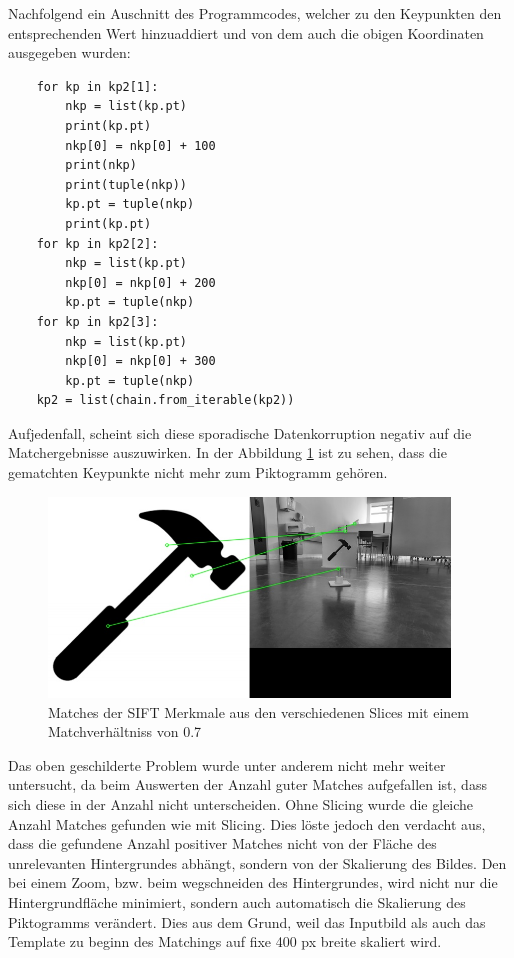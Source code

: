 Nachfolgend ein Auschnitt des Programmcodes, welcher zu den Keypunkten den entsprechenden Wert hinzuaddiert und von dem auch die obigen Koordinaten ausgegeben wurden:

\begin{verbatim}
    for kp in kp2[1]:
        nkp = list(kp.pt)
        print(kp.pt)
        nkp[0] = nkp[0] + 100
        print(nkp)
        print(tuple(nkp))
        kp.pt = tuple(nkp)
        print(kp.pt)
    for kp in kp2[2]:
        nkp = list(kp.pt)
        nkp[0] = nkp[0] + 200
        kp.pt = tuple(nkp)
    for kp in kp2[3]:
        nkp = list(kp.pt)
        nkp[0] = nkp[0] + 300
        kp.pt = tuple(nkp)
    kp2 = list(chain.from_iterable(kp2))
\end{verbatim}

Aufjedenfall, scheint sich diese sporadische Datenkorruption negativ auf die Matchergebnisse auszuwirken. In der Abbildung \ref{fig:sift-matches-slice} ist zu sehen, dass die gematchten Keypunkte nicht mehr zum Piktogramm gehören. 

\begin{figure}[H]
  \includegraphics[width=0.95\textwidth]{img/piktogrammerkennung/sift_matches_slice.jpg}
  \centering
  \caption{Matches der SIFT Merkmale aus den verschiedenen Slices mit einem Matchverhältniss von 0.7}
  \label{fig:sift-matches-slice}
\end{figure}

Das oben geschilderte Problem wurde unter anderem nicht mehr weiter untersucht, da beim Auswerten der Anzahl guter Matches aufgefallen ist, dass sich diese in der Anzahl nicht unterscheiden. Ohne Slicing wurde die gleiche Anzahl Matches gefunden wie mit Slicing. Dies löste jedoch den verdacht aus, dass die gefundene Anzahl positiver Matches nicht von der Fläche des unrelevanten Hintergrundes abhängt, sondern von der Skalierung des Bildes. Den bei einem Zoom, bzw. beim wegschneiden des Hintergrundes, wird nicht nur die Hintergrundfläche minimiert, sondern auch automatisch die Skalierung des Piktogramms verändert. Dies aus dem Grund, weil das Inputbild als auch das Template zu beginn des Matchings auf fixe 400 px breite skaliert wird.

